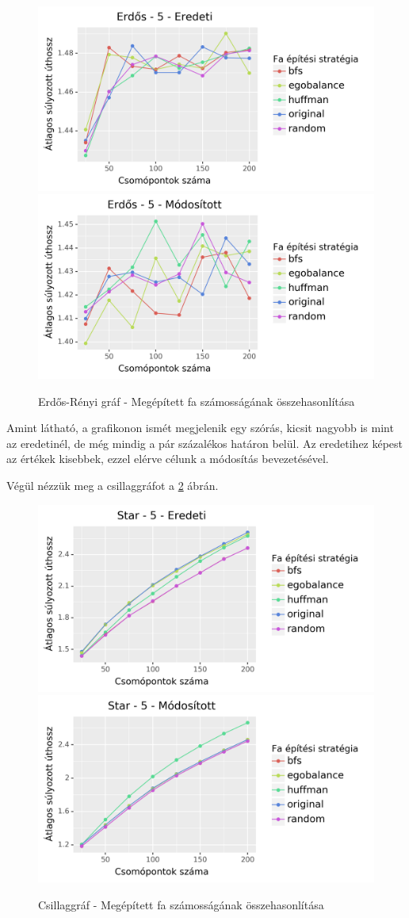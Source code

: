 \documentclass[12pt]{report}
\begin{document}
\begin{figure}[H]
	\begin{center}
		\includegraphics[width=0.49\linewidth]{pictures/erdos_len_e.png}
		\includegraphics[width=0.49\linewidth]{pictures/erdos_len_m.png}
		\caption{Erdős-Rényi gráf - Megépített fa számosságának összehasonlítása}
		\label{erdos-tree-difference-len}
	\end{center}
\end{figure}

Amint látható, a grafikonon ismét megjelenik egy szórás, kicsit nagyobb is mint az eredetinél, de még mindig a pár százalékos határon belül. 
Az eredetihez képest az értékek kisebbek, ezzel elérve célunk a módosítás bevezetésével.

Végül nézzük meg a csillaggráfot a \ref{star-tree-difference-len} ábrán. 

\begin{figure}[H]
	\begin{center}
		\includegraphics[width=0.49\linewidth]{pictures/star_len_e.png}
		\includegraphics[width=0.49\linewidth]{pictures/star_len_m.png}
		\caption{Csillaggráf - Megépített fa számosságának összehasonlítása}
		\label{star-tree-difference-len}
	\end{center}
\end{figure}
\end{document}
